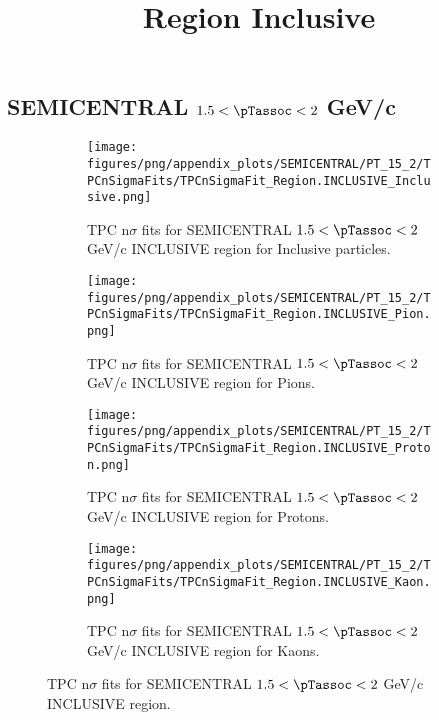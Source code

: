     
            \subsection*{SEMICENTRAL $1.5 < \pTassoc < 2$ GeV/c}
            \begin{figure}[H]
                \title{Region Inclusive}
                \begin{subfigure}[b]{0.5\textwidth}
                    \centering
                    \texttt{[image: figures/png/appendix\_plots/SEMICENTRAL/PT\_15\_2/TPCnSigmaFits/TPCnSigmaFit\_Region.INCLUSIVE\_Inclusive.png]}
                    \caption{TPC n$\sigma$ fits for SEMICENTRAL $1.5 < \pTassoc < 2$ GeV/c INCLUSIVE region for Inclusive particles.}
                    \label{fig:appendix_SEMICENTRAL_$1.5 < \pTassoc < 2$ GeV/c_INCLUSIVE_Inclusive}
                \end{subfigure}
                \begin{subfigure}[b]{0.5\textwidth}
                    \centering
                    \texttt{[image: figures/png/appendix\_plots/SEMICENTRAL/PT\_15\_2/TPCnSigmaFits/TPCnSigmaFit\_Region.INCLUSIVE\_Pion.png]}
                    \caption{TPC n$\sigma$ fits for SEMICENTRAL $1.5 < \pTassoc < 2$ GeV/c INCLUSIVE region for Pions.}
                    \label{fig:appendix_SEMICENTRAL_$1.5 < \pTassoc < 2$ GeV/c_INCLUSIVE_Pion}
                \end{subfigure}
                \begin{subfigure}[b]{0.5\textwidth}
                    \centering
                    \texttt{[image: figures/png/appendix\_plots/SEMICENTRAL/PT\_15\_2/TPCnSigmaFits/TPCnSigmaFit\_Region.INCLUSIVE\_Proton.png]}
                    \caption{TPC n$\sigma$ fits for SEMICENTRAL $1.5 < \pTassoc < 2$ GeV/c INCLUSIVE region for Protons.}
                    \label{fig:appendix_SEMICENTRAL_$1.5 < \pTassoc < 2$ GeV/c_INCLUSIVE_Proton}
                \end{subfigure}
                \begin{subfigure}[b]{0.5\textwidth}
                    \centering
                    \texttt{[image: figures/png/appendix\_plots/SEMICENTRAL/PT\_15\_2/TPCnSigmaFits/TPCnSigmaFit\_Region.INCLUSIVE\_Kaon.png]}
                    \caption{TPC n$\sigma$ fits for SEMICENTRAL $1.5 < \pTassoc < 2$ GeV/c INCLUSIVE region for Kaons.}
                    \label{fig:appendix_SEMICENTRAL_$1.5 < \pTassoc < 2$ GeV/c_INCLUSIVE_Kaon}
                \end{subfigure}
                \caption{TPC n$\sigma$ fits for SEMICENTRAL $1.5 < \pTassoc < 2$ GeV/c INCLUSIVE region.}
                \label{fig:appendix_SEMICENTRAL_$1.5 < \pTassoc < 2$ GeV/c_INCLUSIVE}
            \end{figure}
